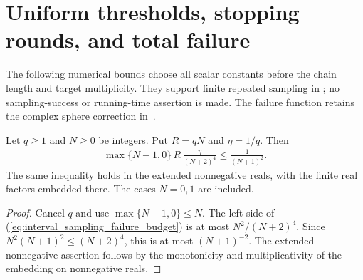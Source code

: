 \section{Uniform thresholds, stopping rounds, and total failure}

The following numerical bounds choose all scalar constants before the chain
length and target multiplicity. They support finite repeated sampling in
\cite[lines 749--755 and 1777--1817]{Arad2016RigorousRG}; no sampling-success
or running-time assertion is made. The failure function retains the complex
sphere correction in~\cite{gap:alvv16_random_sampling_net_count}.

\begin{theorem}
    \label{thm:interval_sampling_failure_budget}
    \leanok
    Let $q\ge1$ and $N\ge0$ be integers. Put $R=qN$ and $\eta=1/q$.
    Then
    \begin{align}
        \max\{N-1,0\}\,R\,\frac{\eta}{(N+2)^4}
        \le\frac{1}{(N+1)^2}.
        \label{eq:interval_sampling_failure_budget}
    \end{align}
    The same inequality holds in the extended nonnegative reals, with
    the finite real factors embedded there. The cases $N=0,1$ are included.
\end{theorem}
\begin{proof}\leanok
    Cancel $q$ and use $\max\{N-1,0\}\le N$. The left side of
    (\ref{eq:interval_sampling_failure_budget}) is at most
    $N^2/(N+2)^4$. Since $N^2(N+1)^2\le(N+2)^4$, this is at most
    $(N+1)^{-2}$. The extended nonnegative assertion follows by the
    monotonicity and multiplicativity of the embedding on nonnegative reals.
\end{proof}

